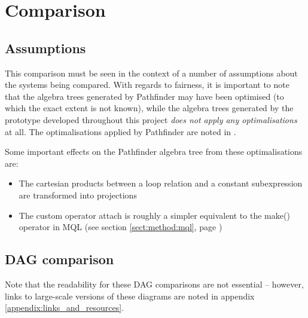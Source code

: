 \section{Comparison}
\label{sect:results:comparison}
\subsection{Assumptions}
This comparison must be seen in the context of a number of assumptions
about the systems being compared. With regards to fairness, it is important to
note that the algebra trees generated by Pathfinder may have been
optimised (to which the exact extent is not known), while the algebra trees
generated by the prototype developed throughout this project \emph{does not apply any optimalisations} at all. The
optimalisations applied by Pathfinder are noted
in \cite{pathfinder_purelyRelational}.

Some important effects on the Pathfinder algebra tree from these
optimalisations are:
\begin{itemize}
  \item The cartesian products between a loop relation and a constant
  subexpression are transformed into projections
  \item The custom operator \textsf{attach} is roughly a simpler equivalent to
  the \textsf{make()} operator in MQL (see section \ref{sect:method:mql}, page
  \pageref{sect:method:mql})
\end{itemize}

\newpage
\subsection{DAG comparison}
Note that the readability for these DAG comparisons are not essential --
however, links to large-scale versions of these diagrams are noted in appendix
\ref{appendix:links_and_resources}.

